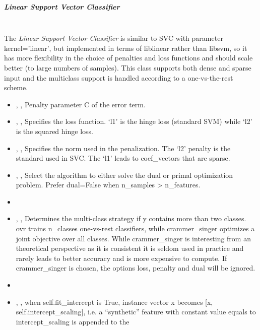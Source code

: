 \subparagraph{Linear Support Vector Classifier}
\mbox{}
\\The \textit{Linear Support Vector Classifier} is similar to SVC with parameter
kernel='linear', but implemented in terms of liblinear rather than libsvm,
so it has more flexibility in the choice of penalties and loss functions and
should scale better (to large numbers of samples).
%
This class supports both dense and sparse input and the multiclass support is
handled according to a one-vs-the-rest scheme.
%
\begin{itemize}
  \item {}, ,
  Penalty parameter C of the error term.
  \item {}, ,
  Specifies the loss function.
  `l1' is the hinge loss (standard SVM) while `l2' is the squared hinge
  loss.
  \item {}, ,
  Specifies the norm used in the penalization.
  The `l2' penalty is the standard used in SVC.
  The `l1' leads to coef\_vectors that are sparse.
  \item {}, ,
  Select the algorithm to either solve the dual or primal optimization problem.
  Prefer dual=False when n\_samples > n\_features.
  \item \tolDescriptionC{}
  \item {}, ,
  Determines the multi-class strategy if y contains more than two classes.
  ovr trains n\_classes one-vs-rest classifiers, while
  crammer\_singer optimizes a joint objective over all classes.
  While crammer\_singer is interesting from an theoretical
  perspective as it is consistent it is seldom used in practice and rarely leads
  to better accuracy and is more expensive to compute.
  If crammer\_singer is chosen, the options loss, penalty and dual
  will be ignored.
  \item {}
  \item {}, ,
  when self.fit\_intercept is True, instance vector x becomes [x,
  self.intercept\_scaling], i.e. a “synthetic” feature with
  constant value equals to intercept\_scaling is appended to the

\end{itemize}

